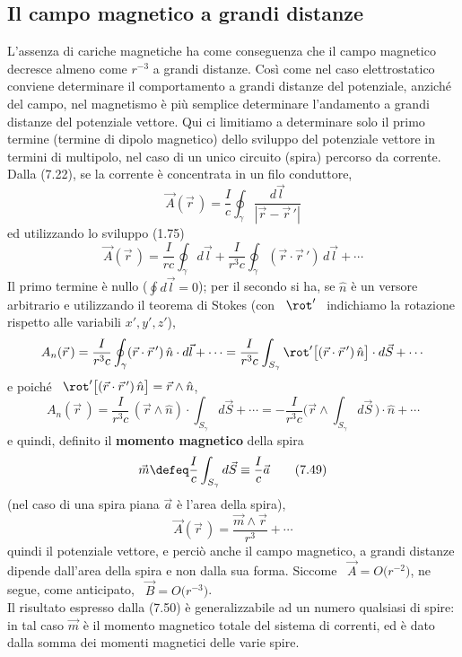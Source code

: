\subsection{Il campo magnetico a grandi distanze}

L'assenza di cariche magnetiche ha come conseguenza che il campo magnetico
decresce almeno come $r^{-3}$ a grandi distanze. Cos\`i come nel caso
elettrostatico conviene determinare il comportamento a grandi distanze del
potenziale, anzich\'e del campo, nel magnetismo \`e pi\`u semplice determinare
l'andamento a grandi distanze del potenziale vettore. Qui ci limitiamo a
determinare solo il primo termine (termine di dipolo magnetico) dello sviluppo
del potenziale vettore in termini di multipolo, nel caso di un unico circuito
(spira) percorso da corrente. Dalla (7.22), se la corrente \`e concentrata in un
filo conduttore,
\begin{equation}
  \vec A(\vec r\,)=\frac{I}{c}\oint_\gamma\frac{d\vec l}{|\vec r-\vec r\,'|}
  \tag{7.46}
\end{equation}
ed utilizzando lo sviluppo (1.75)
\begin{equation}
  \vec A(\vec r\,)=\frac{I}{rc}\oint_\gamma d\vec l
  +\frac{I}{r^3c}\oint_\gamma(\vec r\cdot\vec r\,')\,d\vec l+\cdots
  \tag{7.47}
\end{equation}
Il primo termine \`e nullo \big($\oint d\vec l=0$\big); per il secondo si ha, se
$\hat n$ \`e un versore arbitrario e utilizzando il teorema di Stokes (con
\ $\rot'$ \ indichiamo la rotazione rispetto alle variabili $x',y',z'$),
\[
  A_n(\vec r\,)
  =\frac{I}{r^3c}\oint_\gamma(\vec r\cdot\vec r\,')\,\hat n\cdot d\vec l+\cdots
  =\frac{I}{r^3c}\int_{S_\gamma}\rot'\big[(\vec r\cdot\vec r\,')\,\hat n\big]
  \cdot d\vec S+\cdots
\]
e poich\'e \ $\rot'\big[(\vec r\cdot\vec r\,')\,\hat n\big]=\vec r\wedge\hat n$,
\begin{equation}
  A_n(\vec r\,)=\frac{I}{r^3c}\,(\vec r\wedge\hat n)\cdot\int_{S_\gamma}d\vec S
  +\cdots=-\frac{I}{r^3c}\Big(\vec r\wedge\int_{S_\gamma}d\vec S\,\Big)
  \cdot\hat n+\cdots
  \tag{7.48}
\end{equation}
e quindi, definito il \textbf{momento magnetico} della spira
\begin{equation}
  \vec m\defeq\frac{I}{c}\int_{S_\gamma}d\vec S\equiv\frac{I}{c}\vec a
  \tag{7.49}
\end{equation}
(nel caso di una spira piana $\vec a$ \`e l'area della spira),
\begin{equation}
  \vec A(\vec r\,)=\frac{\vec m\wedge\vec r}{r^3}+\cdots
  \tag{7.50}
\end{equation}
quindi il potenziale vettore, e perci\`o anche il campo magnetico, a grandi
distanze dipende dall'area della spira e non dalla sua forma. Siccome
\ $\vec A=O\big(r^{-2}\big)$, ne segue, come anticipato,
\ $\vec B=O\big(r^{-3}\big)$.\\
Il risultato espresso dalla (7.50) \`e generalizzabile ad un numero qualsiasi di
spire: in tal caso $\vec m$ \`e il momento magnetico totale del sistema di
correnti, ed \`e dato dalla somma dei momenti magnetici delle varie spire.


